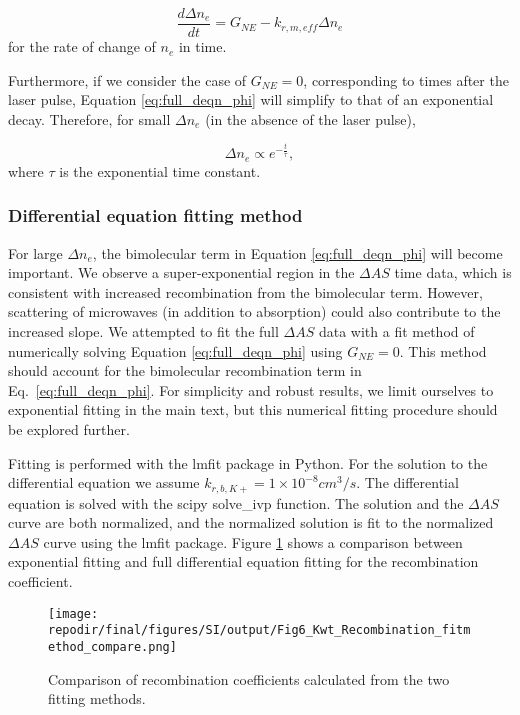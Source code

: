 \begin{equation}
  \label{eq:small_pert_diffeq}
\frac{d\Delta n_{e}}{dt} = G_{NE} - k_{r,m,eff} \Delta n_{e}
\end{equation}
for the rate of change of $n_e$ in time.

Furthermore, if we consider the case of $G_{NE} = 0$, corresponding to times after the laser pulse, Equation \ref{eq:full_deqn_phi} will simplify to that of an exponential decay. Therefore, for small $\Delta n_e$ (in the absence of the laser pulse),  

\begin{equation}
  \label{eq:ne_exp_decay}
  \Delta n_e \propto e^{-\frac{t}{\tau}},
\end{equation}
where $\tau$ is the exponential time constant. 



\label{sec:mwt-diff-eq-fitting}
\subsubsection{Differential equation fitting method }

For large $\Delta n_e$, the bimolecular term in Equation \ref{eq:full_deqn_phi} will become important. We observe a super-exponential region in the $\Delta AS$ time data, which is consistent with increased recombination from the bimolecular term. However, scattering of microwaves (in addition to absorption) could also contribute to the increased slope. We attempted to fit the full $\Delta AS$ data with a fit method of numerically solving Equation \ref{eq:full_deqn_phi} using $G_{NE} = 0$. This method should account for the bimolecular recombination term in Eq.\ \ref{eq:full_deqn_phi}. For simplicity and robust results, we limit ourselves to exponential fitting in the main text, but this numerical fitting procedure should be explored further.

Fitting is performed with the lmfit package in Python. For the solution to the differential equation we assume $k_{r,b,K+} = 1 \times 10^{-8} cm^3/s$. The differential equation is solved with the scipy solve\_ivp function. The solution and the $\Delta AS$ curve are both normalized, and the normalized solution is fit to the normalized $\Delta AS$ curve using the lmfit package. Figure \ref{fig:SI_Kwt_Recombination_fitmethod_compare} shows a comparison between exponential fitting and full differential equation fitting for the recombination coefficient. 

\begin{figure}[]
\centering
\texttt{[image: \\repodir/final/figures/SI/output/Fig6\_Kwt\_Recombination\_fitmethod\_compare.png]}
\caption{Comparison of recombination coefficients calculated from the two fitting methods.}
\label{fig:SI_Kwt_Recombination_fitmethod_compare}
\end{figure}
